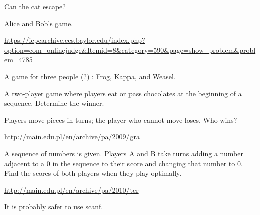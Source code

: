 \begin{pbox}
Can the cat escape?
  
\end{pbox}

\begin{pbox}
Alice and Bob's game.

\url{https://icpcarchive.ecs.baylor.edu/index.php?option=com_onlinejudge&Itemid=8&category=590&page=show_problem&problem=4785}
\end{pbox}

\begin{pbox}[Iyasugigappa]
A game for three people (?) : Frog, Kappa, and Weasel.

\end{pbox}

\begin{pbox}
A two-player game where players eat or pass chocolates at the beginning of a sequence. Determine the winner.

\end{pbox}

\begin{pbox}
Players move pieces in turns; the player who cannot move loses. Who wins?

\url{http://main.edu.pl/en/archive/pa/2009/gra}
\end{pbox}

\begin{pbox}[Termites]
A sequence of numbers is given. Players A and B take turns adding a number adjacent to a 0 in the sequence to their score and changing that number to 0. Find the scores of both players when they play optimally.

\url{http://main.edu.pl/en/archive/pa/2010/ter}
\end{pbox}

It is probably safer to use scanf.
